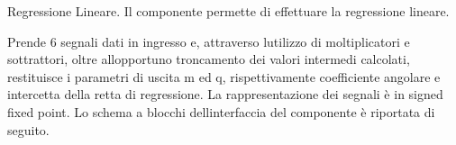 Regressione Lineare. Il componente permette di effettuare la regressione lineare.

Prende 6 segnali dati in ingresso e, attraverso l\textquotesingle{}utilizzo di moltiplicatori e sottrattori, oltre all\textquotesingle{}opportuno troncamento dei valori intermedi calcolati, restituisce i parametri di uscita m ed q, rispettivamente coefficiente angolare e intercetta della retta di regressione. La rappresentazione dei segnali è in signed fixed point. Lo schema a blocchi dell\textquotesingle{}interfaccia del componente è riportata di seguito.  